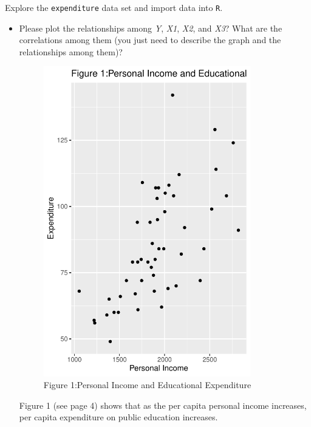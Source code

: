 \documentclass[12pt,letterpaper]{article}
\begin{document}
	\vspace{.5cm}
	\noindent Explore the \texttt{expenditure} data set and import data into \texttt{R}.
	\vspace{.5cm}
	  
	\vspace{.5cm}
	\begin{itemize}
		
		\item
		Please plot the relationships among \emph{Y}, \emph{X1}, \emph{X2}, and \emph{X3}? What are the correlations among them (you just need to describe the graph and the relationships among them)?
		\vspace{.5cm}
		
		  
		\vspace{.5cm}
		\begin{figure}\centering
		\caption{Figure 1:Personal Income and Educational Expenditure}
		\includegraphics[width=0.85\textwidth]{Rplot1.pdf}
	    \end{figure}	
		Figure 1 (see page 4) shows that as the per capita personal income increases, per capita expenditure on public education increases.
		\vspace{.5cm}
		

\end{itemize}
\end{document}
